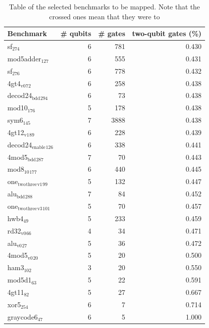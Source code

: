 \begin{table}[htbp]
\caption{Table of the selected benchmarks to be mapped. Note that the crossed ones mean that they were to}
\centering
\small
\begin{tabular}{lrrr}
\hline
Benchmark & \# qubits & \# gates & two-qubit gates (\%)\\
\hline
sf\(_{\text{274}}\) & 6 & 781 & 0.430\\
mod5adder\(_{\text{127}}\) & 6 & 555 & 0.431\\
sf\(_{\text{276}}\) & 6 & 778 & 0.432\\
4gt4\(_{\text{v0}}\)\(_{\text{72}}\) & 6 & 258 & 0.438\\
decod24\(_{\text{bdd}}\)\(_{\text{294}}\) & 6 & 73 & 0.438\\
mod10\(_{\text{176}}\) & 5 & 178 & 0.438\\
sym6\(_{\text{145}}\) & 7 & 3888 & 0.438\\
4gt12\(_{\text{v1}}\)\(_{\text{89}}\) & 6 & 228 & 0.439\\
decod24\(_{\text{enable}}\)\(_{\text{126}}\) & 6 & 338 & 0.441\\
4mod5\(_{\text{bdd}}\)\(_{\text{287}}\) & 7 & 70 & 0.443\\
mod8\(_{\text{10}}\)\(_{\text{177}}\) & 6 & 440 & 0.445\\
one\(_{\text{two}}\)\(_{\text{three}}\)\(_{\text{v1}}\)\(_{\text{99}}\) & 5 & 132 & 0.447\\
alu\(_{\text{bdd}}\)\(_{\text{288}}\) & 7 & 84 & 0.452\\
one\(_{\text{two}}\)\(_{\text{three}}\)\(_{\text{v3}}\)\(_{\text{101}}\) & 5 & 70 & 0.457\\
hwb4\(_{\text{49}}\) & 5 & 233 & 0.459\\
rd32\(_{\text{v0}}\)\(_{\text{66}}\) & 4 & 34 & 0.471\\
alu\(_{\text{v0}}\)\(_{\text{27}}\) & 5 & 36 & 0.472\\
4mod5\(_{\text{v0}}\)\(_{\text{20}}\) & 5 & 20 & 0.500\\
ham3\(_{\text{102}}\) & 3 & 20 & 0.550\\
mod5d1\(_{\text{63}}\) & 5 & 22 & 0.591\\
4gt11\(_{\text{82}}\) & 5 & 27 & 0.667\\
xor5\(_{\text{254}}\) & 6 & 7 & 0.714\\
graycode6\(_{\text{47}}\) & 6 & 5 & 1.000\\
\hline
\end{tabular}
\end{table}

